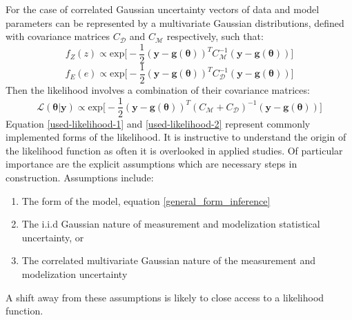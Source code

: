 \begin{tcolorbox}[enhanced jigsaw,breakable,pad at break*=1mm,title=Technical figure 2: Applied likelihood derivation, title filled,fonttitle=\sffamily\bfseries,fontupper=\sffamily\scriptsize]
\begin{multicols}{2}
For the case of correlated Gaussian uncertainty vectors of data and model parameters can be represented by a multivariate Gaussian distributions, defined with covariance matrices $C_{\mathcal{D}}$ and $C_{\mathcal{M}}$ respectively, such that:
\begin{equation}
f_Z(z) \propto \text{exp}\bigg[-\frac{1}{2}(\bm{y}-\bm{g}(\bm{\theta}))^TC_{\mathcal{M}}^{-1}(\bm{y}-\bm{g}(\bm{\theta}))\bigg]
\end{equation}
\begin{equation}
f_E(e) \propto \text{exp}\bigg[-\frac{1}{2}(\bm{y}-\bm{g}(\bm{\theta}))^TC_{\mathcal{D}}^{-1}(\bm{y}-\bm{g}(\bm{\theta}))\bigg]
\end{equation}
Then the likelihood involves a combination of their covariance matrices:
\begin{equation}
\mathcal{L}(\bm{\theta}|\bm{y}) \propto \text{exp}\bigg[-\frac{1}{2}(\bm{y}-\bm{g}(\bm{\theta}))^T(C_{\mathcal{M}}+C_{\mathcal{D}})^{-1}(\bm{y}-\bm{g}(\bm{\theta}))\bigg]
\label{used-likelihood-2}
\end{equation}
Equation \ref{used-likelihood-1} and \ref{used-likelihood-2} represent commonly implemented forms of the likelihood. It is instructive to understand the origin of the likelihood function as often it is overlooked in applied studies. Of particular importance are the explicit assumptions which are necessary steps in construction. Assumptions include:
\begin{enumerate}
\item The form of the model, equation \ref{general_form_inference}
\item The i.i.d Gaussian nature of measurement and modelization statistical uncertainty, or
\item The correlated multivariate Gaussian nature of the measurement and modelization uncertainty
\end{enumerate}
A shift away from these assumptions is likely to close access to a likelihood function.
\end{multicols}
\end{tcolorbox}